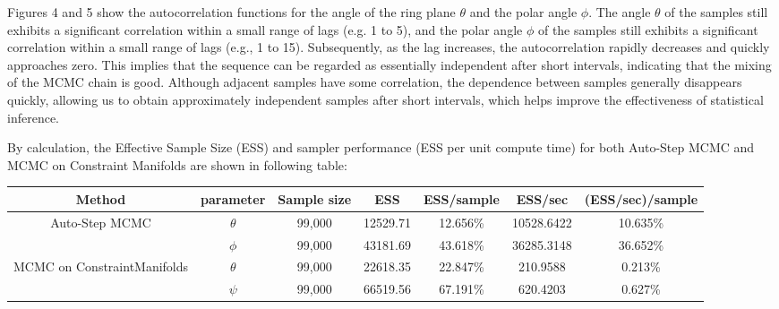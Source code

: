 \documentclass{article}
\begin{document}



    
Figures 4 and 5 show the autocorrelation functions for the angle of the ring plane $\theta$ and the polar angle $\phi$. The angle $\theta$ of the samples still exhibits a significant correlation within a small range of lags (e.g. 1 to 5), and the polar angle $\phi$ of the samples still exhibits a significant correlation within a small range of lags (e.g., 1 to 15). Subsequently, as the lag increases, the autocorrelation rapidly decreases and quickly approaches zero. This implies that the sequence can be regarded as essentially independent after short intervals, indicating that the mixing of the MCMC chain is good. Although adjacent samples have some correlation, the dependence between samples generally disappears quickly, allowing us to obtain approximately independent samples after short intervals, which helps improve the effectiveness of statistical inference.

By calculation, the Effective Sample Size (ESS) and sampler performance (ESS per unit compute time) for both Auto-Step MCMC and MCMC on Constraint Manifolds are shown in following table:

\begin{center}
\begin{tabular}{ |c|c|c|c|c|c|c| } 
\hline
Method & parameter &Sample size& ESS & ESS/sample & ESS/sec & (ESS/sec)/sample  \\
\hline
\multirow{2}{5em}{Auto-Step MCMC} & $\theta $& 99,000 & 12529.71 & 12.656\% & 10528.6422 & 10.635\%\\ 

&$\phi$ & 99,000 & 43181.69 & 43.618\%& 36285.3148 & 36.652\%\\
\hline
\multirow{2}{9em}{MCMC on ConstraintManifolds} & $\theta$ & 99,000 & 22618.35 &22.847\% & 210.9588 & 0.213\%\\
& $\psi$ & 99,000 & 66519.56 & 67.191\% & 620.4203 & 0.627\% \\ 


\hline
\hline
\end{tabular}
\end{center}
\end{document}
